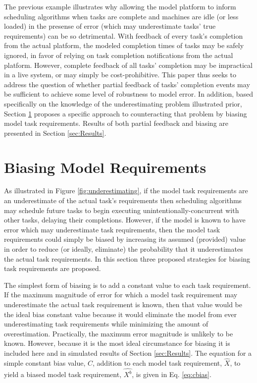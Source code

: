 \documentclass[10pt]{csce}
\begin{document}
The previous example illustrates why allowing the model platform to
inform scheduling algorithms when tasks are complete and machines are
idle (or less loaded) in the presense of error (which may underestimate tasks'
true requirements) can be so detrimental.  With feedback of every task's
completion from the actual platform, the modeled completion times of tasks
may be safely ignored, in favor of relying on task completion notifications
from the actual platform.  However, complete feedback of all tasks' completion
may be impractical in a live system, or may simply be cost-prohibitive.
This paper thus seeks to address the question of whether partial feedback
of tasks' completion events may be sufficient to achieve some level of
robustness to model error.  In addition, based specifically on the knowledge
of the underestimating problem illustrated prior, Section \ref{sec:Biasing}
proposes a specific approach to counteracting that problem by biasing model
task requirements.  Results of both partial feedback and biasing are presented
in Section \ref{sec:Results}.


\section{Biasing Model Requirements}
\label{sec:Biasing}

As illustrated in Figure \ref{fig:underestimating}, if the model task
requirements are an underestimate of the actual task's requirements then
scheduling algorithms may schedule future tasks to begin executing
unintentionally-concurrent with other tasks, delaying their completions.
However, if the model is known to have error which may underestimate task
requirements, then the model task requirements could simply be biased by
increasing its assumed (provided) value in order to reduce (or ideally,
eliminate) the probability that it underestimates the actual task requirements.
In this section three proposed strategies for biasing task requirements are
proposed.

The simplest form of biasing is to add a constant value to each task
requirement.  If the maximum magnitude of error for which a model
task requirement may underestimate the actual task requirement is known,
then that value would be the ideal bias constant value because it would
eliminate the model from ever underestimating task requirements while
minimizing the amount of overestimation. Practically, the maximum error
magnitude is unlikely to be known. However, because it is the most ideal
circumstance for biasing it is included here and in simulated results of
Section \ref{sec:Results}. The equation for a simple constant bias value, $C$,
addition to each model task requirement, $\hat{X}$, to yield a biased model
task requirement, $\hat{X^b}$, is given in Eq. \ref{eq:cbias}.
\end{document}
